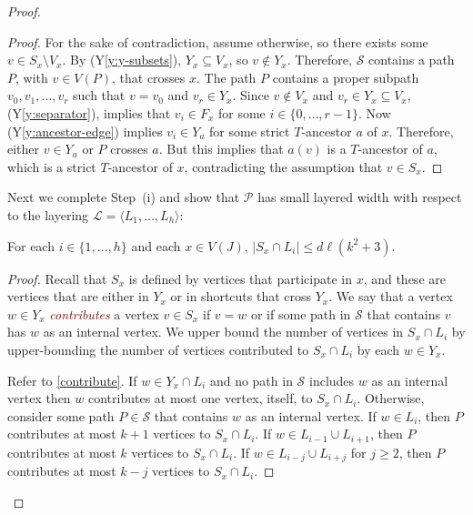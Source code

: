 \documentclass{patmorin}
\newcommand{\defin}[1]{\textcolor{Maroon}{\emph{#1}}}
\newcommand{\note}[2]{\noindent{\color{red}[#1:~#2]}}
\newcommand{\referee}[2]{\noindent\textcolor{blue}{\framebox{\begin{minipage}{\textwidth} Ref \#{#1}: #2\end{minipage}}}}
\newcommand{\yref}[1]{(Y\ref{y:#1})}
\renewcommand{\SS}{\mathcal{S}}
\renewcommand{\ge}{\geqslant}
\renewcommand{\le}{\leqslant}
\begin{document}
\begin{proof}
\begin{proof}
  For the sake of contradiction, assume otherwise, so there exists some $v\in S_x\setminus V_x$. By \yref{y-subsets}, $Y_x\subseteq V_x$, so $v\not\in Y_x$.  Therefore, $\SS$ contains a path $P$, with $v\in V(P)$, that crosses $x$.  The path $P$ contains a proper subpath $v_0,v_1,\ldots,v_{r}$ such that $v=v_0$ and $v_r\in Y_x$. Since $v\not\in V_x$ and $v_r\in Y_x\subseteq V_x$, \yref{separator}, implies that $v_i\in F_x$ for some $i\in\{0,\ldots,r-1\}$. Now \yref{ancestor-edge} implies $v_i\in Y_a$ for some strict $T$-ancestor $a$ of $x$.  Therefore, either $v\in Y_a$ or $P$ crosses $a$. But this implies that $a(v)$ is a $T$-ancestor of $a$, which is a strict $T$-ancestor of $x$, contradicting the assumption that $v\in S_x$.
\end{proof}

Next we complete Step~(i) and show that $\mathcal{P}$ has small layered width with respect to the layering $\mathcal{L}=\langle L_1,\ldots,L_h\rangle$:

\begin{clm}
	\label{general-width}
  For each $i\in\{1,\ldots,h\}$ and each $x\in V(J)$, $|S_x\cap L_i|\le d\ell(k^2+3)$.
\end{clm}

\begin{proof}
  Recall that $S_x$ is defined by vertices that participate in $x$, and these are vertices that are either in $Y_x$ or in shortcuts that cross $Y_x$.  We say that a vertex $w\in Y_x$ \defin{contributes} a vertex $v\in S_x$ if $v=w$ or if some path in $\SS$ that contains $v$ has $w$ as an internal vertex.
  We upper bound the number of vertices in $S_x\cap L_i$ by upper-bounding the number of vertices contributed to $S_x\cap L_i$ by each $w\in Y_x$. 
  
  Refer to \cref{contribute}.  If $w\in Y_x\cap L_i$ and no path in $\SS$ includes $w$ as an internal vertex then $w$ contributes at most one vertex, itself, to $S_x\cap L_i$.
  Otherwise, consider some path $P\in\SS$ that contains $w$ as an internal vertex.  If $w\in L_{i}$, then $P$ contributes at most $k+1$ vertices to $S_x\cap L_i$.  If $w\in L_{i-1}\cup L_{i+1}$, then $P$ contributes at most $k$ vertices to $S_x\cap L_i$. If $w\in L_{i-j}\cup L_{i+j}$ for $j\ge 2$, then $P$ contributes at most $k-j$ vertices to $S_x\cap L_i$.
% 
% 


\end{proof}
\end{proof}
\end{document}
